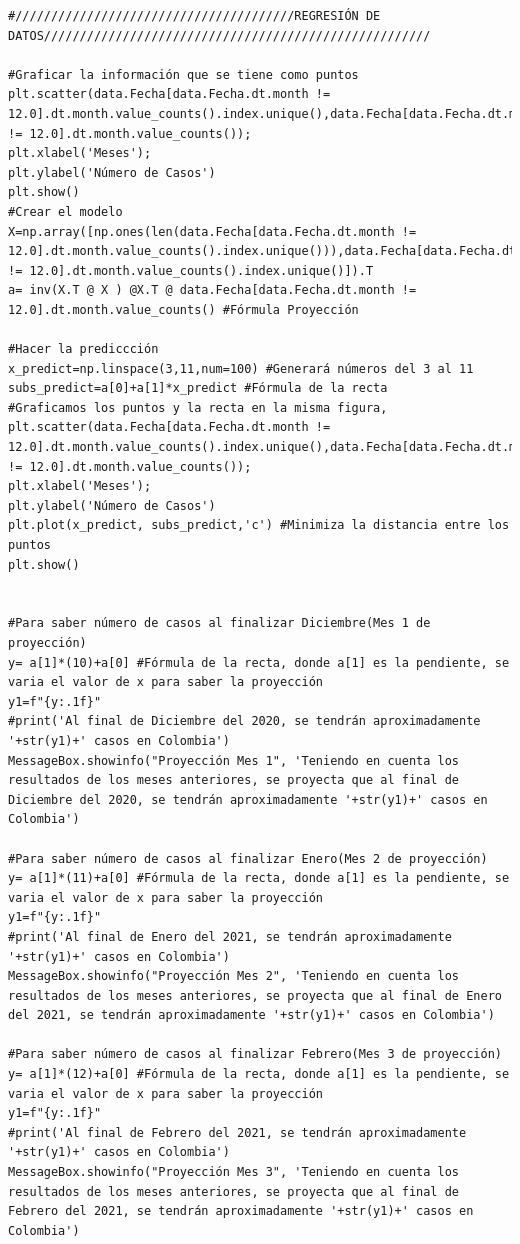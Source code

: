 \documentclass[conference,compsoc,onecolumn]{IEEEtran}
\begin{document}
\begin{lstlisting}
#///////////////////////////////////////REGRESIÓN DE DATOS//////////////////////////////////////////////////////

#Graficar la información que se tiene como puntos
plt.scatter(data.Fecha[data.Fecha.dt.month != 12.0].dt.month.value_counts().index.unique(),data.Fecha[data.Fecha.dt.month != 12.0].dt.month.value_counts());
plt.xlabel('Meses');
plt.ylabel('Número de Casos')
plt.show()
#Crear el modelo
X=np.array([np.ones(len(data.Fecha[data.Fecha.dt.month != 12.0].dt.month.value_counts().index.unique())),data.Fecha[data.Fecha.dt.month != 12.0].dt.month.value_counts().index.unique()]).T
a= inv(X.T @ X ) @X.T @ data.Fecha[data.Fecha.dt.month != 12.0].dt.month.value_counts() #Fórmula Proyección

#Hacer la prediccción
x_predict=np.linspace(3,11,num=100) #Generará números del 3 al 11
subs_predict=a[0]+a[1]*x_predict #Fórmula de la recta
#Graficamos los puntos y la recta en la misma figura,
plt.scatter(data.Fecha[data.Fecha.dt.month != 12.0].dt.month.value_counts().index.unique(),data.Fecha[data.Fecha.dt.month != 12.0].dt.month.value_counts());
plt.xlabel('Meses');
plt.ylabel('Número de Casos')
plt.plot(x_predict, subs_predict,'c') #Minimiza la distancia entre los puntos
plt.show()


#Para saber número de casos al finalizar Diciembre(Mes 1 de proyección)
y= a[1]*(10)+a[0] #Fórmula de la recta, donde a[1] es la pendiente, se varia el valor de x para saber la proyección
y1=f"{y:.1f}"
#print('Al final de Diciembre del 2020, se tendrán aproximadamente '+str(y1)+' casos en Colombia')
MessageBox.showinfo("Proyección Mes 1", 'Teniendo en cuenta los resultados de los meses anteriores, se proyecta que al final de Diciembre del 2020, se tendrán aproximadamente '+str(y1)+' casos en Colombia')

#Para saber número de casos al finalizar Enero(Mes 2 de proyección)
y= a[1]*(11)+a[0] #Fórmula de la recta, donde a[1] es la pendiente, se varia el valor de x para saber la proyección
y1=f"{y:.1f}"
#print('Al final de Enero del 2021, se tendrán aproximadamente '+str(y1)+' casos en Colombia')
MessageBox.showinfo("Proyección Mes 2", 'Teniendo en cuenta los resultados de los meses anteriores, se proyecta que al final de Enero del 2021, se tendrán aproximadamente '+str(y1)+' casos en Colombia')

#Para saber número de casos al finalizar Febrero(Mes 3 de proyección)
y= a[1]*(12)+a[0] #Fórmula de la recta, donde a[1] es la pendiente, se varia el valor de x para saber la proyección
y1=f"{y:.1f}"
#print('Al final de Febrero del 2021, se tendrán aproximadamente '+str(y1)+' casos en Colombia')
MessageBox.showinfo("Proyección Mes 3", 'Teniendo en cuenta los resultados de los meses anteriores, se proyecta que al final de Febrero del 2021, se tendrán aproximadamente '+str(y1)+' casos en Colombia')
\end{lstlisting}
\\\
\end{document}
